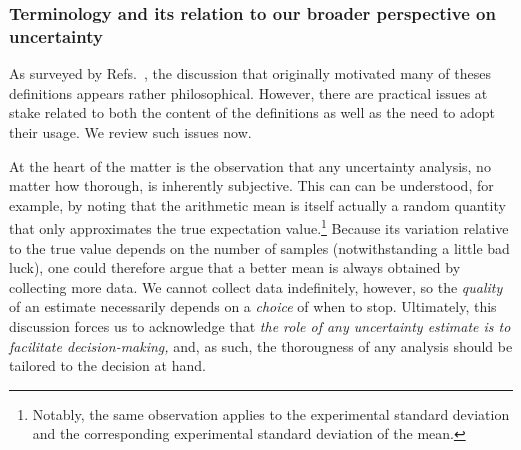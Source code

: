 



\subsubsection{Terminology and its relation to our broader perspective on uncertainty}

As surveyed by Refs.~\citep{JCGM:GUM2008,JCGM:VIM2012}, the discussion that originally motivated many of theses definitions appears rather philosophical.  However, there are practical issues at stake related to both the content of the definitions as well as the need to adopt their usage.  We review such issues now.

At the heart of the matter is the observation that any uncertainty analysis, no matter how thorough, is inherently subjective.  This can can be understood, for example, by noting that the arithmetic mean is itself actually a random quantity that only approximates the true expectation value.\footnote{Notably, the same observation applies to the experimental standard deviation and the corresponding experimental standard deviation of the mean.}  Because its variation relative to the true value depends on the number of samples (notwithstanding a little bad luck), one could therefore argue that a better mean is always obtained by collecting more data.   We cannot collect data indefinitely, however, so the {\it quality} of an estimate necessarily depends on a {\it choice} of when to stop.  Ultimately, this discussion forces us to acknowledge that {\it the role of any uncertainty estimate is to facilitate decision-making,} and, as such, the thorougness of any analysis should be tailored to the decision at hand.  

